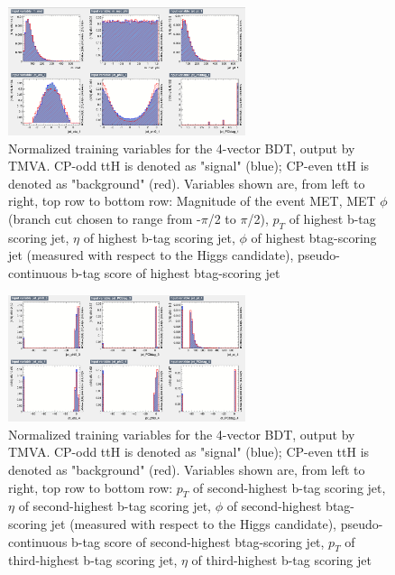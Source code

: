 \begin{figure}[htbp]
  \centering
  \includegraphics[width=0.62\textwidth]{figures/TMVABDTStudies/semilep-vbls4vec/semilep4vecvbls2.png}
  \caption{Normalized training variables for the 4-vector BDT, output by TMVA. CP-odd ttH is denoted as "signal" (blue); CP-even ttH is denoted as "background" (red). Variables shown are, from left to right, top row to bottom row: Magnitude of the event MET, MET $\phi$ (branch cut chosen to range from -$\pi$/2 to $\pi$/2), $p_{T}$ of highest b-tag scoring jet, $\eta$ of highest b-tag scoring jet, $\phi$ of highest btag-scoring jet (measured with respect to the Higgs candidate), pseudo-continuous b-tag score of highest btag-scoring jet}
  \label{fig:semilep4vecvbls2}
\end{figure}

\begin{figure}[htbp]
  \centering
  \includegraphics[width=0.62\textwidth]{figures/TMVABDTStudies/semilep-vbls4vec/semilep4vecvbls4.png}
  \caption{Normalized training variables for the 4-vector BDT, output by TMVA. CP-odd ttH is denoted as "signal" (blue); CP-even ttH is denoted as "background" (red). Variables shown are, from left to right, top row to bottom row: $p_{T}$ of second-highest b-tag scoring jet, $\eta$ of second-highest b-tag scoring jet, $\phi$ of second-highest btag-scoring jet (measured with respect to the Higgs candidate), pseudo-continuous b-tag score of second-highest btag-scoring jet, $p_{T}$ of third-highest b-tag scoring jet, $\eta$ of third-highest b-tag scoring jet}
  \label{fig:semilep4vecvbls4}
\end{figure}


